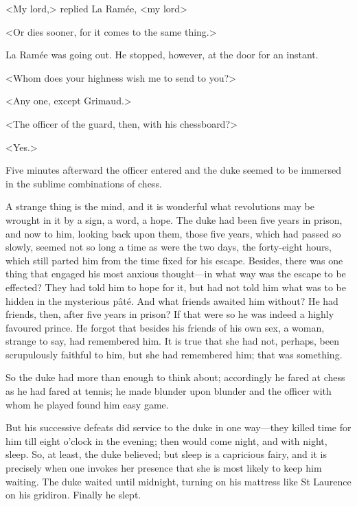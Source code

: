 <My lord,> replied La Ramée, <my lord\longdash>

<Or dies sooner, for it comes to the same thing.>

La Ramée was going out. He stopped, however, at the door for an instant.

<Whom does your highness wish me to send to you?>

<Any one, except Grimaud.>

<The officer of the guard, then, with his chessboard?>

<Yes.>

Five minutes afterward the officer entered and the duke seemed to be immersed in the sublime combinations of chess.

A strange thing is the mind, and it is wonderful what revolutions may be wrought in it by a sign, a word, a hope. The duke had been five years in prison, and now to him, looking back upon them, those five years, which had passed so slowly, seemed not so long a time as were the two days, the forty-eight hours, which still parted him from the time fixed for his escape. Besides, there was one thing that engaged his most anxious thought—in what way was the escape to be effected? They had told him to hope for it, but had not told him what was to be hidden in the mysterious pâté. And what friends awaited him without? He had friends, then, after five years in prison? If that were so he was indeed a highly favoured prince. He forgot that besides his friends of his own sex, a woman, strange to say, had remembered him. It is true that she had not, perhaps, been scrupulously faithful to him, but she had remembered him; that was something.

So the duke had more than enough to think about; accordingly he fared at chess as he had fared at tennis; he made blunder upon blunder and the officer with whom he played found him easy game.

But his successive defeats did service to the duke in one way—they killed time for him till eight o'clock in the evening; then would come night, and with night, sleep. So, at least, the duke believed; but sleep is a capricious fairy, and it is precisely when one invokes her presence that she is most likely to keep him waiting. The duke waited until midnight, turning on his mattress like St Laurence on his gridiron. Finally he slept.

